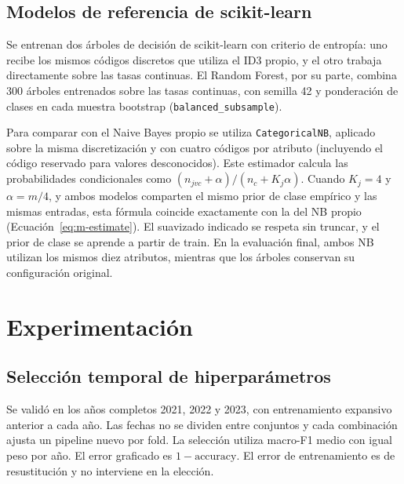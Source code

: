 \documentclass[conference]{IEEEtran}
\begin{document}
\subsection{Modelos de referencia de scikit-learn}
Se entrenan dos árboles de decisión de scikit-learn con criterio de entropía: uno recibe los mismos códigos discretos que utiliza el ID3 propio, y el otro trabaja directamente sobre las tasas continuas. El Random Forest, por su parte, combina 300 árboles entrenados sobre las tasas continuas, con semilla 42 y ponderación de clases en cada muestra bootstrap (\texttt{balanced\_subsample}).

Para comparar con el Naive Bayes propio se utiliza \texttt{CategoricalNB}, aplicado sobre la misma discretización y con cuatro códigos por atributo (incluyendo el código reservado para valores desconocidos). Este estimador calcula las probabilidades condicionales como $(n_{jvc}+\alpha)/(n_c+K_j\alpha)$. Cuando $K_j=4$ y $\alpha=m/4$, y ambos modelos comparten el mismo prior de clase empírico y las mismas entradas, esta fórmula coincide exactamente con la del NB propio (Ecuación~\ref{eq:m-estimate}). El suavizado indicado se respeta sin truncar, y el prior de clase se aprende a partir de train. En la evaluación final, ambos NB utilizan los mismos diez atributos, mientras que los árboles conservan su configuración original.

\section{Experimentación}
\label{sec:experimentacion}

\subsection{Selección temporal de hiperparámetros}
Se validó en los años completos 2021, 2022 y 2023, con entrenamiento expansivo anterior a cada año. Las fechas no se dividen entre conjuntos y cada combinación ajusta un pipeline nuevo por fold. La selección utiliza macro-F1 medio con igual peso por año. El error graficado es $1-\mathrm{accuracy}$. El error de entrenamiento es de resustitución y no interviene en la elección.
\end{document}
